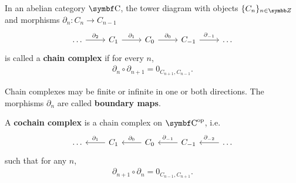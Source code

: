 \begin{definition}\label{def:chain_complex}\cite{nLab:chain_complex}
  In an abelian category \( \Bold{C} \), the tower diagram with objects \( \{ C_n \}_{n \in \BB{Z}} \) and morphisms \( \partial_n: C_n \to C_{n-1} \)
  \begin{equation}\label{def:chain_complex/chain_diagram}
    \begin{tikzcd}[baseline=(current bounding box.center)]
      \ldots \arrow[r, "\partial_2"] & C_1 \arrow[r, "\partial_1"] & C_0 \arrow[r, "\partial_0"] & C_{-1} \arrow[r, "\partial_{-1}"] & \ldots
    \end{tikzcd}
  \end{equation}
  is called a \textbf{chain complex} if for every \( n \),
  \begin{align*}
    \partial_n \circ \partial_{n+1} = 0_{C_{n+1},C_{n-1}}.
  \end{align*}

  Chain complexes may be finite or infinite in one or both directions. The morphisms \( \partial_n \) are called \textbf{boundary maps}.

  A \textbf{cochain complex} is a chain complex on \( \Bold{C}^{\Op} \), i.e.
  \begin{equation}\label{def:chain_complex/cochain_diagram}
    \begin{tikzcd}[baseline=(current bounding box.center)]
      \ldots & C_1 \arrow[l, "\partial_1"'] & C_0 \arrow[l, "\partial_0"'] & C_{-1} \arrow[l, "\partial_{-1}"'] & \ldots \arrow[l, "\partial_{-2}"']
    \end{tikzcd}
  \end{equation}
  such that for any \( n \),
  \begin{align*}
    \partial_{n+1} \circ \partial_n = 0_{C_{n-1},C_{n+1}}.
  \end{align*}
\end{definition}
